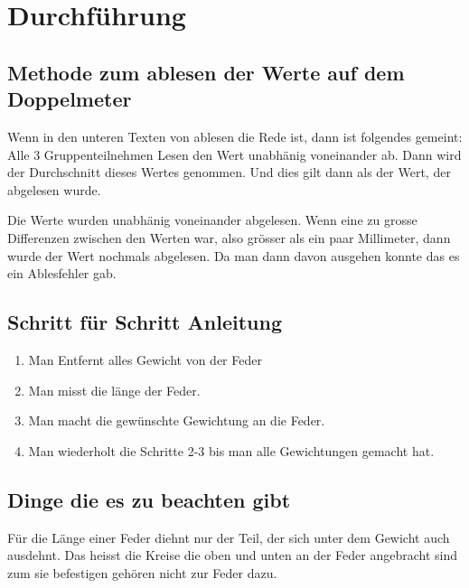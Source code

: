 \documentclass[../main.tex]{subfiles} %
\begin{document}
    \section{Durchführung}\label{sec:durchführung}
    
    \subsection{Methode zum ablesen der Werte auf dem Doppelmeter}\label{subsec:methode-zum-ablesen-der-werte-auf-dem-doppelmeter}

    Wenn in den unteren Texten von ablesen die Rede ist, dann ist folgendes gemeint:
    Alle 3 Gruppenteilnehmen Lesen den Wert unabhänig voneinander ab. Dann wird der Durchschnitt dieses Wertes genommen. Und dies gilt dann als der Wert, der abgelesen wurde.

    \begin{tcolorbox}[title=Hinweis beilm Ablesen]
        Die Werte wurden unabhänig voneinander abgelesen.
        Wenn eine zu grosse Differenzen zwischen den Werten war, also grösser als ein paar Millimeter, dann wurde der Wert nochmals abgelesen.
        Da man dann davon ausgehen konnte das es ein Ablesfehler gab.
    \end{tcolorbox}

    \subsection{Schritt für Schritt Anleitung}\label{subsec:schritt-für-schritt-anleitung}
    \begin{enumerate}
        \item Man Entfernt alles Gewicht von der Feder
        \item Man misst die länge der Feder.
        \item Man macht die gewünschte Gewichtung an die Feder.
        \item Man wiederholt die Schritte 2-3 bis man alle Gewichtungen gemacht hat.
    \end{enumerate}

    \subsection{Dinge die es zu beachten gibt}\label{subsec:dinge-die-es-zu-beachten-gibt}
    Für die Länge einer Feder diehnt nur der Teil, der sich unter dem Gewicht auch ausdehnt. Das heisst die Kreise die oben und unten an der Feder angebracht sind zum sie befestigen gehören nicht zur Feder dazu.
\end{document}

